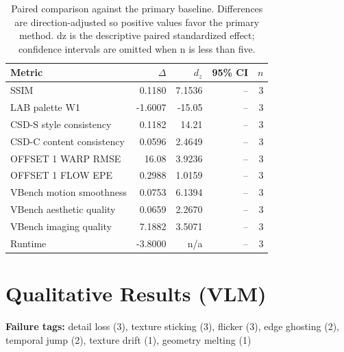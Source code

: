\documentclass[10pt]{article}
\begin{document}
\begin{table}[H]
\centering
\caption{Paired comparison against the primary baseline. Differences are direction-adjusted so positive values favor the primary method. dz is the descriptive paired standardized effect; confidence intervals are omitted when n is less than five.}
\label{tab:paired-effects}
\small
\begin{tabular}{@{}lrrrr@{}}
\toprule
Metric & $\Delta$ & $d_z$ & 95\% CI & $n$ \\
\midrule
SSIM & 0.1180 & 7.1536 & -- & 3 \\
LAB palette W1 & -1.6007 & -15.05 & -- & 3 \\
CSD-S style consistency & 0.1182 & 14.21 & -- & 3 \\
CSD-C content consistency & 0.0596 & 2.4649 & -- & 3 \\
OFFSET 1 WARP RMSE & 16.08 & 3.9236 & -- & 3 \\
OFFSET 1 FLOW EPE & 0.2988 & 1.0159 & -- & 3 \\
VBench motion smoothness & 0.0753 & 6.1394 & -- & 3 \\
VBench aesthetic quality & 0.0659 & 2.2670 & -- & 3 \\
VBench imaging quality & 7.1882 & 3.5071 & -- & 3 \\
Runtime & -3.8000 & n/a & -- & 3 \\
\bottomrule
\end{tabular}
\end{table}
\section*{Qualitative Results (VLM)}
\begin{table}[H]
\centering
\caption{Blinded visual scores (1--5). Higher is better for all dimensions.}
\label{tab:vlm}
\small
{}
\end{table}
\noindent\textbf{Failure tags:} detail loss (3), texture sticking (3), flicker (3), edge ghosting (2), temporal jump (2), texture drift (1), geometry melting (1)\par
\end{document}
